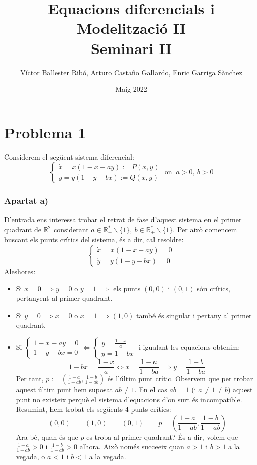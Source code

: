 \documentclass{article}
\title{Equacions diferencials i Modelització II \\ Seminari II}
\author{Víctor Ballester Ribó, Arturo Castaño Gallardo, Enric Garriga Sànchez}
\date{Maig 2022}
\newcommand{\R}{\mathbb R}
\begin{document}
\maketitle 
\section*{Problema 1}
Considerem el següent sistema diferencial:
\begin{equation}
  \begin{cases}
    \dot{x}=x(1-x-ay):=P(x,y) \\
    \dot{y}=y(1-y-bx):=Q(x,y) 
  \end{cases}
  \text{ on } \ a>0, \ b>0
\end{equation}
\subsubsection*{Apartat a)}
D'entrada ens interessa trobar el retrat de fase d'aquest sistema en el primer quadrant de $\R^2$ considerant $a \in \R_+^*\backslash\{1\}, \ b \in \R_+^*\backslash\{1\}$. Per això comencem buscant els punts crítics del sistema, és a dir, cal resoldre: 
\begin{equation}
  \begin{cases}
    \dot{x}=x(1-x-ay) =0 \\
    \dot{y}=y(1-y-bx)=0
  \end{cases}
\end{equation}
Aleshores:
\begin{itemize}
  \item Si $x=0 \implies y=0$ o $y=1 \implies$ els punts $(0,0)$ i $(0,1)$ són crítics, pertanyent al primer quadrant.
  \item Si $y=0 \implies x=0$ o $x=1 \implies (1,0)$ també és singular i pertany al primer quadrant.
  \item Si
        $\begin{cases}
            1-x-ay=0 \\
            1-y-bx=0
          \end{cases}\iff
          \begin{cases}
            y=\frac{1-x}{a} \\
            y=1-bx
          \end{cases}$ i
        igualant les equacions obtenim:
        $$ 1-bx=\frac{1-x}{a} \iff x=\frac{1-a}{1-ba} \implies y=\frac{1-b}{1-ba}$$
        Per tant, $p:=(\frac{1-a}{1-ab}, \frac{1-b}{1-ab})$ és l'últim punt crític. Observem que per trobar aquest últim punt hem suposat $ab\neq1$. En el cas $ab=1$ (i $a\neq1\neq b$) aquest punt no existeix perquè el sistema d'equacions d'on surt és incompatible.
        \\Resumint, hem trobat els següents 4 punts crítics:
        $$ (0,0)\qquad(1,0)\qquad(0,1)\qquad p=\left(\frac{1-a}{1-ab}, \frac{1-b}{1-ab}\right)$$
        Ara bé, quan és que $p$ es troba al primer quadrant? És a dir, volem que $\frac{1-a}{1-ab}>0$ i $\frac{1-b}{1-ab}>0$ alhora. Això només succeeix quan $a>1$ i $b>1$ a la vegada, o $a<1$ i $b<1$ a la vegada.  
\end{itemize}
\end{document}
